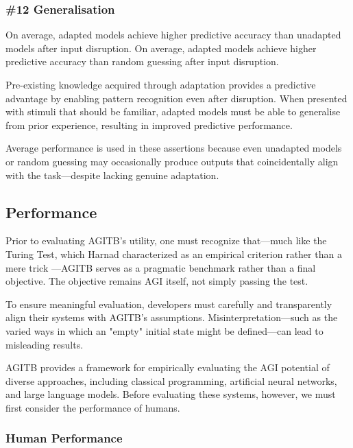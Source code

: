 \documentclass{article}
\newenvironment{two_assertions}[2]
{
	\begin{tabular}{p{1.5cm}p{8.2cm}}
		\textbf{Assertion:} & #1 \\
		\textbf{Assertion:} & #2 \\
	}{
	\end{tabular}\\
}
\begin{document}
	\subsubsection*{\#12 Generalisation}
	\begin{two_assertions}
		{On average, adapted models achieve higher predictive accuracy than unadapted models after input disruption.}
		{On average, adapted models achieve higher predictive accuracy than random guessing after input disruption.}
	\end{two_assertions}
	
	Pre-existing knowledge acquired through adaptation provides a predictive advantage by enabling pattern recognition even after disruption. When presented with stimuli that should be familiar, adapted models must be able to generalise from prior experience, resulting in improved predictive performance.
	
	Average performance is used in these assertions because even unadapted models or random guessing may occasionally produce outputs that coincidentally align with the task—despite lacking genuine adaptation.
	
	\subsection{Performance}
	
	Prior to evaluating AGITB’s utility, one must recognize that—much like the Turing Test, which Harnad characterized as an empirical criterion rather than a mere trick \cite{Harnad1992}—AGITB serves as a pragmatic benchmark rather than a final objective. The objective remains AGI itself, not simply passing the test.
	
	To ensure meaningful evaluation, developers must carefully and transparently align their systems with AGITB's assumptions. Misinterpretation—such as the varied ways in which an "empty" initial state might be defined—can lead to
	misleading results.
	
	AGITB provides a framework for empirically evaluating the AGI potential of diverse approaches, including classical programming, artificial neural networks, and large language models. Before evaluating these systems, however, we must first consider the performance of humans.
	
	\subsubsection{Human Performance}
	
\end{document}
